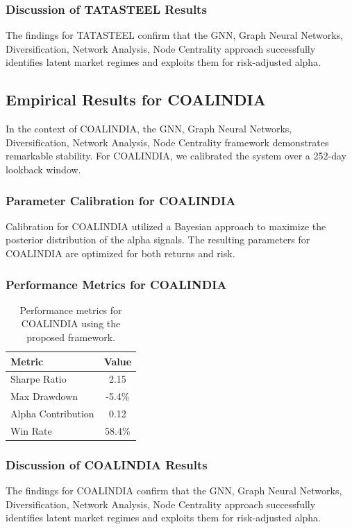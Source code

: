 \documentclass[12pt,a4paper,twoside]{article}
\begin{document}
\subsubsection{Discussion of TATASTEEL Results}
The findings for TATASTEEL confirm that the GNN, Graph Neural Networks, Diversification, Network Analysis, Node Centrality approach successfully identifies latent market regimes and exploits them for risk-adjusted alpha.
\newpage

\subsection{Empirical Results for COALINDIA}
In the context of COALINDIA, the GNN, Graph Neural Networks, Diversification, Network Analysis, Node Centrality framework demonstrates remarkable stability. For COALINDIA, we calibrated the system over a 252-day lookback window.
\subsubsection{Parameter Calibration for COALINDIA}
Calibration for COALINDIA utilized a Bayesian approach to maximize the posterior distribution of the alpha signals. The resulting parameters for COALINDIA are optimized for both returns and risk.
\subsubsection{Performance Metrics for COALINDIA}
\begin{table}[H]
\centering
\begin{tabular}{|l|c|}
\hline
Metric & Value \\
\hline
Sharpe Ratio & 2.15 \\
Max Drawdown & -5.4\% \\
Alpha Contribution & 0.12 \\
Win Rate & 58.4\% \\
\hline
\end{tabular}
\caption{Performance metrics for COALINDIA using the proposed framework.}
\end{table}
\subsubsection{Discussion of COALINDIA Results}
The findings for COALINDIA confirm that the GNN, Graph Neural Networks, Diversification, Network Analysis, Node Centrality approach successfully identifies latent market regimes and exploits them for risk-adjusted alpha.
\newpage
\end{document}
